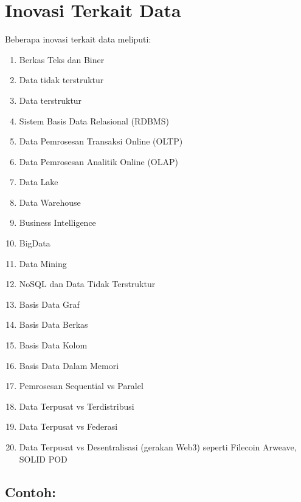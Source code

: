 \section{Inovasi Terkait Data}
Beberapa inovasi terkait data meliputi:

\begin{enumerate}
	\item Berkas Teks dan Biner
	\item Data tidak terstruktur
	\item Data terstruktur
	\item Sistem Basis Data Relasional (RDBMS)
	\item Data Pemrosesan Transaksi Online (OLTP)
	\item Data Pemrosesan Analitik Online (OLAP)
	\item Data Lake
	\item Data Warehouse
	\item Business Intelligence
	\item BigData
	\item Data Mining
	\item NoSQL dan Data Tidak Terstruktur
	\item Basis Data Graf
	\item Basis Data Berkas
	\item Basis Data Kolom
	\item Basis Data Dalam Memori
	\item Pemrosesan Sequential vs Paralel
	\item Data Terpusat vs Terdistribusi
	\item Data Terpusat vs Federasi
	\item Data Terpusat vs Desentralisasi (gerakan Web3) seperti Filecoin Arweave, SOLID POD
\end{enumerate}

\subsection*{Contoh:}

